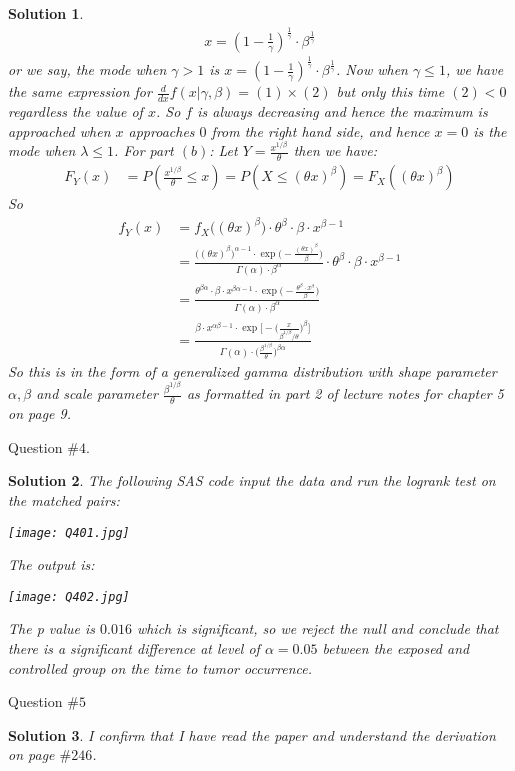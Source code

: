 \documentclass[11pt]{article}
\newtheorem{sol}{Solution}
\begin{document}
\begin{sol}
	\begin{align*}
		x = (1 - \frac{1}{\gamma})^{\frac{1}{\gamma}}\cdot \beta^{\frac{1}{\gamma}}
	\end{align*}
	or we say, the mode when $\gamma >1$ is $x = (1 - \frac{1}{\gamma})^{\frac{1}{\gamma}}\cdot \beta^{\frac{1}{\gamma}}$.\vskip 2mm
	Now when $\gamma \leq 1$, we have the same expression for $\frac{d}{dx}f(x|\gamma, \beta) = (1) \times (2)$ but only this time $(2) < 0$ regardless the value of $x$. So $f$ is always decreasing and hence the maximum is approached when $x$ approaches $0$ from the right hand side, and hence $x = 0$ is the mode when $\lambda \leq 1$.\vskip 2mm
	For part $(b)$:\vskip 2mm
	Let $Y = \frac{x^{1/\beta}}{\theta}$ then we have:
	\begin{align*}
		F_Y(x) &= P(\frac{x^{1/\beta}}{\theta} \leq x) = P(X \leq (\theta x)^{\beta}) = F_X((\theta x)^{\beta})
	\end{align*}
	So
	\begin{align*}
		f_Y(x) &= f_X\Big((\theta x)^{\beta}\Big) \cdot \theta^{\beta}\cdot \beta \cdot x^{\beta - 1}\\
		&= \frac{\Big((\theta x)^{\beta}\Big)^{\alpha - 1}\cdot \exp\Big(-\frac{(\theta x)^{\beta}}{\beta}\Big)}{\Gamma(\alpha)\cdot \beta^{\alpha}}\cdot \theta^{\beta}\cdot \beta \cdot x^{\beta - 1}\\
		&= \frac{\theta^{\beta\alpha}\cdot \beta \cdot x^{\beta\alpha - 1}\cdot \exp\Big(-\frac{\theta^{\beta}\cdot x^{\beta}}{\beta}\Big)}{\Gamma(\alpha)\cdot \beta^{\alpha}}\\
		&= \frac{\beta\cdot x^{\alpha\beta - 1}\cdot \exp\Big[-\Big(\frac{x}{\beta^{1/\beta}/\theta}\Big)^{\beta}\Big]}{\Gamma(\alpha)\cdot \Big(\frac{\beta^{1/\beta}}{\theta}\Big)^{\beta\alpha}}
	\end{align*}
	So this is in the form of a generalized gamma distribution with shape parameter $\alpha, \beta$ and scale parameter $\frac{\beta^{1/\beta}}{\theta}$ as formatted in part 2 of lecture notes for chapter 5 on page 9.
\end{sol}

Question $\# 4$.
\begin{sol}
	The following SAS code input the data and run the logrank test on the matched pairs:
	\begin{center}
		\texttt{[image: Q401.jpg]}
	\end{center}
	The output is:
	\begin{center}
		\texttt{[image: Q402.jpg]}
	\end{center}
	The p value is $0.016$ which is significant, so we reject the null and conclude that there is a significant difference at level of $\alpha = 0.05$ between the exposed and controlled group on the time to tumor occurrence.
\end{sol}

Question $\#5$
\begin{sol}
	I confirm that I have read the paper and understand the derivation on page $\#246$.
\end{sol}
\end{document}
